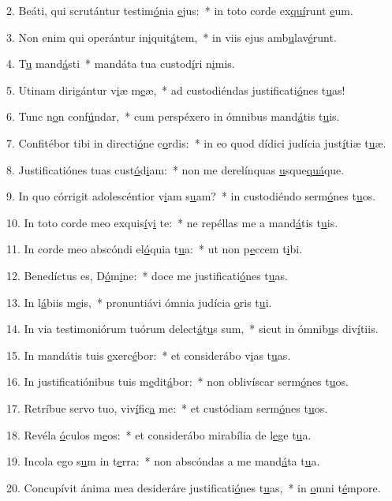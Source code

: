 2. Beáti, qui scrutántur testim\uline{ó}nia \uline{e}jus:~* in toto corde ex\uline{quí}runt \uline{e}um.\par 
3. Non enim qui operántur in\uline{i}quit\uline{á}tem,~* in viis ejus amb\uline{u}lav\uline{é}runt.\par 
4. T\uline{u} mand\uline{á}sti~* mandáta tua custod\uline{í}ri n\uline{i}mis.\par 
5. Utinam dirigántur v\uline{i}æ m\uline{e}æ,~* ad custodiéndas justificati\uline{ó}nes t\uline{u}as!\par 
6. Tunc n\uline{o}n conf\uline{ú}ndar,~* cum perspéxero in ómnibus mand\uline{á}tis t\uline{u}is.\par 
7. Confitébor tibi in directi\uline{ó}ne c\uline{o}rdis:~* in eo quod dídici judícia just\uline{í}tiæ t\uline{u}æ.\par 
8. Justificatiónes tuas cust\uline{ó}d\uline{i}am:~* non me derelínquas \uline{u}sque\uline{quá}que.\par 
9. In quo córrigit adolescéntior v\uline{i}am s\uline{u}am?~* in custodiéndo serm\uline{ó}nes t\uline{u}os.\par 
10. In toto corde meo exquis\uline{í}v\uline{i} te:~* ne repéllas me a mand\uline{á}tis t\uline{u}is.\par 
11. In corde meo abscóndi el\uline{ó}quia t\uline{u}a:~* ut non p\uline{e}ccem t\uline{i}bi.\par 
12. Benedíctus es, D\uline{ó}m\uline{i}ne:~* doce me justificati\uline{ó}nes t\uline{u}as.\par 
13. In l\uline{á}biis m\uline{e}is,~* pronuntiávi ómnia judícia \uline{o}ris t\uline{u}i.\par 
14. In via testimoniórum tuórum delect\uline{á}t\uline{u}s sum,~* sicut in ómnib\uline{u}s div\uline{í}tiis.\par 
15. In mandátis tuis \uline{e}xerc\uline{é}bor:~* et considerábo v\uline{i}as t\uline{u}as.\par 
16. In justificatiónibus tuis m\uline{e}dit\uline{á}bor:~* non oblivíscar serm\uline{ó}nes t\uline{u}os.\par 
17. Retríbue servo tuo, viv\uline{í}fic\uline{a} me:~* et custódiam serm\uline{ó}nes t\uline{u}os.\par 
18. Revéla \uline{ó}culos m\uline{e}os:~* et considerábo mirabília de l\uline{e}ge t\uline{u}a.\par 
19. Incola ego s\uline{u}m in t\uline{e}rra:~* non abscóndas a me mand\uline{á}ta t\uline{u}a.\par 
20. Concupívit ánima mea desideráre justificati\uline{ó}nes t\uline{u}as,~* in \uline{o}mni t\uline{é}mpore.\par 
